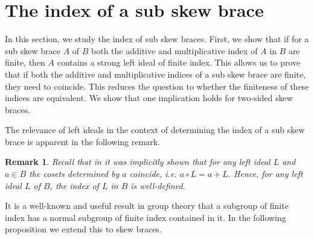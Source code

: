 \documentclass{amsart}
\newtheorem{rem}[thm]{Remark}
\begin{document}
\section{The index of a sub skew brace}\label{secindex}



In this section, we study the index of sub skew braces. First, we show that if for a sub skew brace $A$ of $B$ both the additive and multiplicative index of $A$ in $B$ are finite, then $A$ contains a strong left ideal of finite index. This allows us to prove that if both the additive and multiplicative indices of a sub skew brace are finite, they need to coincide. This reduces the question to whether the finiteness of these indices are equivalent. We show that one implication holds for two-sided skew braces.


The relevance of left ideals in the context of determining the index of a sub skew brace is apparent in the following remark.

\begin{rem}\label{inv}
   Recall that in \cite{MR3647970} it was implicitly shown that for any left ideal $L$ and $a\in B$ the cosets determined by $a$ coincide, i.e. $ a \circ L = a + L$. Hence, for any left ideal $L$ of $B$, the index of $L$ in $B$ is well-defined. 
\end{rem}

It is a well-known and useful result in group theory that a subgroup of finite index has a normal subgroup of finite index contained in it. In the following proposition we extend this to skew braces.
\end{document}
